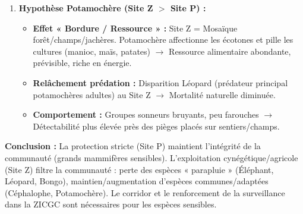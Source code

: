 \documentclass[11pt]{article}
\begin{document}
\begin{exoresolu}
\begin{enumerate}
\begin{itemize}
                  \item Nécessite : Augmenter effort, utiliser indices (traces, crottes, griffades), enquêtes locales, pièges à poils (ADN).
              \end{itemize}
        \item \textbf{Hypothèse Potamochère (Site Z $>$ Site P) :}
              \begin{itemize}
                  \item \textbf{Effet « Bordure / Ressource » :} Site Z = Mosaïque forêt/champs/jachères. Potamochère affectionne les écotones et pille les cultures (manioc, maïs, patates) $\rightarrow$ Ressource alimentaire abondante, prévisible, riche en énergie.
                  \item \textbf{Relâchement prédation :} Disparition Léopard (prédateur principal potamochères adultes) au Site Z $\rightarrow$ Mortalité naturelle diminuée.
                  \item \textbf{Comportement :} Groupes sonneurs bruyants, peu farouches $\rightarrow$ Détectabilité plus élevée près des pièges placés sur sentiers/champs.
              \end{itemize}
    \end{enumerate}
    \textbf{Conclusion :} La protection stricte (Site P) maintient l'intégrité de la communauté (grands mammifères sensibles). L'exploitation cynégétique/agricole (Site Z) filtre la communauté : perte des espèces « parapluie » (Éléphant, Léopard, Bongo), maintien/augmentation d'espèces communes/adaptées (Céphalophe, Potamochère). Le corridor et le renforcement de la surveillance dans la ZICGC sont nécessaires pour les espèces sensibles.
\end{exoresolu}
\end{document}
